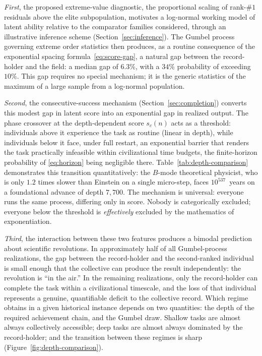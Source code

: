 \documentclass{article}
\begin{document}
\emph{First}, the proposed extreme-value diagnostic, the proportional scaling of rank-$\#1$ residuals above the elite subpopulation, motivates a log-normal working model of latent ability relative to the comparator families considered, through an illustrative inference scheme (Section~\ref{sec:inference}). The Gumbel process governing extreme
order statistics then produces, as a routine consequence of the
exponential spacing formula~\eqref{eq:score-gap}, a natural gap between
the record-holder and the field: a median gap of $6.3\%$, with a $34\%$
probability of exceeding $10\%$. This gap requires no special
mechanism; it is the generic statistics of the maximum of a large
sample from a log-normal population.

\emph{Second}, the consecutive-success mechanism
(Section~\ref{sec:completion}) converts this modest gap in latent
score into an exponential gap in realized output. The phase
crossover at the depth-dependent score $s_c(n)$ acts as a threshold:
individuals above it experience the task as routine (linear in
depth), while individuals below it face, under full restart, an exponential barrier that renders the task practically infeasible within civilizational time budgets, the finite-horizon probability of \eqref{eq:horizon} being negligible there. Table~\ref{tab:depth-comparison}
demonstrates this transition quantitatively: the $B$-mode
theoretical physicist, who is only $1.2$ times slower than Einstein
on a single micro-step, faces $10^{537}$~years on a foundational
advance of depth $7{,}700$. The mechanism is universal: everyone
runs the same process, differing only in score. Nobody is
categorically excluded; everyone below the threshold is
\emph{effectively} excluded by the mathematics of exponentiation.

\emph{Third}, the interaction between these two features produces
a bimodal prediction about scientific revolutions. In approximately
half of all Gumbel-process realizations, the gap between the
record-holder and the second-ranked individual is small enough that
the collective can produce the result independently: the revolution
is ``in the air.'' In the remaining realizations, only the
record-holder can complete the task within a civilizational
timescale, and the loss of that individual represents a genuine,
quantifiable deficit to the collective record. Which regime
obtains in a given historical instance depends on two quantities:
the depth of the required achievement chain, and the Gumbel draw.
Shallow tasks are almost always collectively accessible; deep tasks
are almost always dominated by the record-holder; and the
transition between these regimes is sharp
(Figure~\ref{fig:depth-comparison}).
\end{document}
